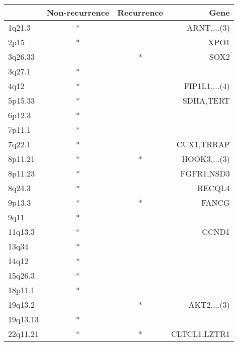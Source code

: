 \begin{tabular}{lccr}
\toprule
{} & Non-recurrence & Recurrence &           Gene \\
\midrule
1q21.3   &              * &            &    ARNT,...(3) \\
2p15     &              * &            &           XPO1 \\
3q26.33  &                &          * &           SOX2 \\
3q27.1   &              * &            &                \\
4q12     &              * &            &  FIP1L1,...(4) \\
5p15.33  &              * &            &      SDHA,TERT \\
6p12.3   &              * &            &                \\
7p11.1   &              * &            &                \\
7q22.1   &              * &            &     CUX1,TRRAP \\
8p11.21  &              * &          * &   HOOK3,...(3) \\
8p11.23  &              * &            &     FGFR1,NSD3 \\
8q24.3   &              * &            &         RECQL4 \\
9p13.3   &              * &          * &          FANCG \\
9q11     &              * &            &                \\
11q13.3  &              * &            &          CCND1 \\
13q34    &              * &            &                \\
14q12    &              * &            &                \\
15q26.3  &              * &            &                \\
18p11.1  &              * &            &                \\
19q13.2  &                &          * &    AKT2,...(3) \\
19q13.13 &              * &            &                \\
22q11.21 &              * &          * &   CLTCL1,LZTR1 \\
\bottomrule
\end{tabular}
